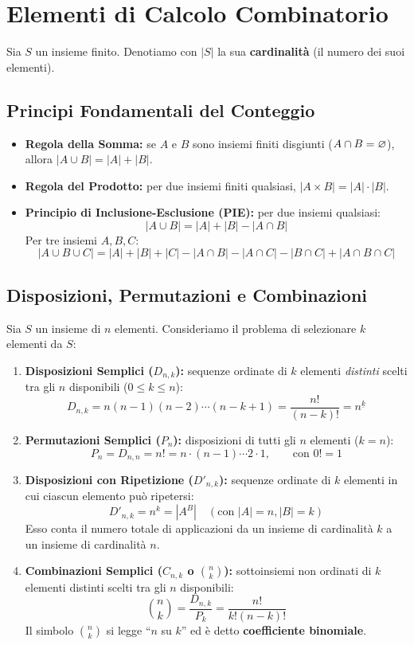 \section{Elementi di Calcolo Combinatorio}

Sia $S$ un insieme finito. Denotiamo con $|S|$ la sua \textbf{cardinalità} (il numero dei suoi elementi).

\subsection{Principi Fondamentali del Conteggio}
\begin{itemize}
    \item \textbf{Regola della Somma:} se $A$ e $B$ sono insiemi finiti disgiunti ($A \cap B = \varnothing$), allora $|A \cup B| = |A| + |B|$.
    \item \textbf{Regola del Prodotto:} per due insiemi finiti qualsiasi, $|A \times B| = |A| \cdot |B|$.
    \item \textbf{Principio di Inclusione-Esclusione (PIE):} per due insiemi qualsiasi:
    \[
        |A \cup B| = |A| + |B| - |A \cap B|
    \]
    Per tre insiemi $A, B, C$:
    \[
        |A \cup B \cup C| = |A| + |B| + |C| - |A \cap B| - |A \cap C| - |B \cap C| + |A \cap B \cap C|
    \]
\end{itemize}

\subsection{Disposizioni, Permutazioni e Combinazioni}
Sia $S$ un insieme di $n$ elementi. Consideriamo il problema di selezionare $k$ elementi da $S$:

\begin{enumerate}
    \item \textbf{Disposizioni Semplici ($D_{n, k}$):} sequenze ordinate di $k$ elementi \emph{distinti} scelti tra gli $n$ disponibili ($0 \le k \le n$):
    \[
        D_{n, k} = n(n-1)(n-2)\cdots(n-k+1) = \frac{n!}{(n-k)!} = n^{\underline{k}}
    \]
    \item \textbf{Permutazioni Semplici ($P_n$):} disposizioni di tutti gli $n$ elementi ($k = n$):
    \[
        P_n = D_{n, n} = n! = n \cdot (n-1) \cdots 2 \cdot 1, \qquad \text{con } 0! = 1
    \]
    \item \textbf{Disposizioni con Ripetizione ($D'_{n, k}$):} sequenze ordinate di $k$ elementi in cui ciascun elemento può ripetersi:
    \[
        D'_{n, k} = n^k = |A^B| \quad (\text{con } |A| = n, |B| = k)
    \]
    Esso conta il numero totale di applicazioni da un insieme di cardinalità $k$ a un insieme di cardinalità $n$.
    \item \textbf{Combinazioni Semplici ($C_{n, k}$ o $\binom{n}{k}$):} sottoinsiemi non ordinati di $k$ elementi distinti scelti tra gli $n$ disponibili:
    \[
        \binom{n}{k} = \frac{D_{n, k}}{P_k} = \frac{n!}{k!(n-k)!}
    \]
    Il simbolo $\binom{n}{k}$ si legge ``$n$ su $k$'' ed è detto \textbf{coefficiente binomiale}.
\end{enumerate}

